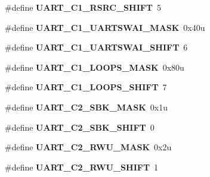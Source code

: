 \begin{DoxyCompactItemize}
\#define {\bfseries U\+A\+R\+T\+\_\+\+C1\+\_\+\+R\+S\+R\+C\+\_\+\+S\+H\+I\+FT}~5
\item 
\mbox{\label{group___u_a_r_t___register___masks_ga466f5bf7b0cd3c3517da3a6c6a9baaac}} 
\#define {\bfseries U\+A\+R\+T\+\_\+\+C1\+\_\+\+U\+A\+R\+T\+S\+W\+A\+I\+\_\+\+M\+A\+SK}~0x40u
\item 
\mbox{\label{group___u_a_r_t___register___masks_gac7888d995fd947613eea08bdee534ffc}} 
\#define {\bfseries U\+A\+R\+T\+\_\+\+C1\+\_\+\+U\+A\+R\+T\+S\+W\+A\+I\+\_\+\+S\+H\+I\+FT}~6
\item 
\mbox{\label{group___u_a_r_t___register___masks_ga08f1bbd905640d81967f9fb6d4ed8ec8}} 
\#define {\bfseries U\+A\+R\+T\+\_\+\+C1\+\_\+\+L\+O\+O\+P\+S\+\_\+\+M\+A\+SK}~0x80u
\item 
\mbox{\label{group___u_a_r_t___register___masks_gac6beea8a7bad0b0fc3c3535f629fcf3a}} 
\#define {\bfseries U\+A\+R\+T\+\_\+\+C1\+\_\+\+L\+O\+O\+P\+S\+\_\+\+S\+H\+I\+FT}~7
\item 
\mbox{\label{group___u_a_r_t___register___masks_ga8d243e5b3a3ece12bdeca818bacb15ee}} 
\#define {\bfseries U\+A\+R\+T\+\_\+\+C2\+\_\+\+S\+B\+K\+\_\+\+M\+A\+SK}~0x1u
\item 
\mbox{\label{group___u_a_r_t___register___masks_ga94f62ff8a45a08ae54b40da725fb245b}} 
\#define {\bfseries U\+A\+R\+T\+\_\+\+C2\+\_\+\+S\+B\+K\+\_\+\+S\+H\+I\+FT}~0
\item 
\mbox{\label{group___u_a_r_t___register___masks_ga279868a42acca3c1eeba8c53bb94b208}} 
\#define {\bfseries U\+A\+R\+T\+\_\+\+C2\+\_\+\+R\+W\+U\+\_\+\+M\+A\+SK}~0x2u
\item 
\mbox{\label{group___u_a_r_t___register___masks_gaa163993d547a96c2ea002ff52e6b0971}} 
\#define {\bfseries U\+A\+R\+T\+\_\+\+C2\+\_\+\+R\+W\+U\+\_\+\+S\+H\+I\+FT}~1
\item 
\mbox{\label{group___u_a_r_t___register___masks_ga181a8e8fd0f780d45f1bff7c76836fe5}} 

\end{DoxyCompactItemize}
